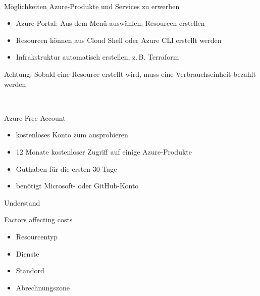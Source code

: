 \documentclass{scrartcl}
\newenvironment{flashcard}[2][]{%
    #1
    \vfill
    \centerline{\Large{#2}}
    \vfill
\newpage
}
{\newpage}
\begin{document}
    \begin{flashcard}[\ ]{Möglichkeiten Azure-Produkte und Services zu erwerben}
        \begin{itemize}
            \item Azure Portal: Aus dem Menü auswählen, Resourcen erstellen
            \item Resourcen können aus Cloud Shell oder Azure CLI erstellt werden
            \item Infrakstruktur automatisch erstellen, z.\,B. Terraform
        \end{itemize}

        \vspace{5mm}
        Achtung: Sobald eine Resource erstellt wird, muss eine Verbrauchseinheit bezahlt werden
    \end{flashcard}

    \begin{flashcard}[\ ]{Azure Free Account}
        \begin{itemize}
            \item kostenloses Konto zum ausprobieren
            \item 12 Monate kostenloser Zugriff auf einige Azure-Produkte
            \item Guthaben für die ersten 30 Tage
            \item benötigt Microsoft- oder GitHub-Konto
        \end{itemize}

    \end{flashcard}

    \begin{flashcard}[Understand]{Factors affecting costs}
        \begin{itemize}
            \item Resourcentyp
            \item Dienste
            \item Standord
            \item Abrechnungszone
        \end{itemize}

    \end{flashcard}
\end{document}

